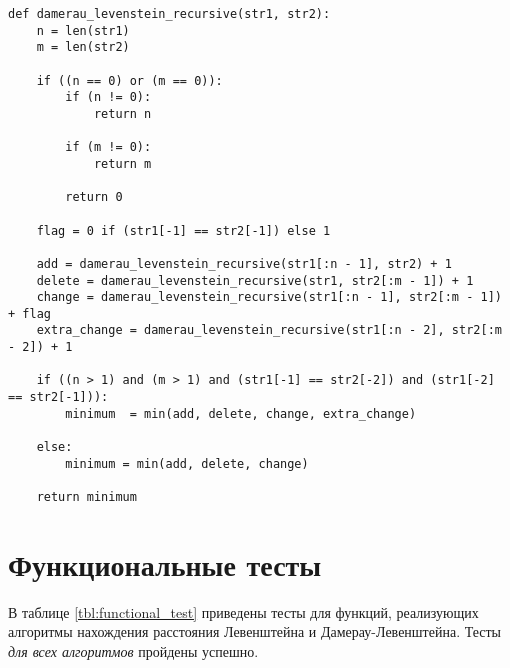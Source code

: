 \begin{center}
    \captionsetup{justification=raggedright,singlelinecheck=off}
    \begin{lstlisting}[label=lst:dam_lev_rec,caption=Алгоритм нахождения расстояния Дамерау-Левенштейна (реккурсивный)]
def damerau_levenstein_recursive(str1, str2):
    n = len(str1)
    m = len(str2)

    if ((n == 0) or (m == 0)):
        if (n != 0):
            return n
        
        if (m != 0):
            return m

        return 0

    flag = 0 if (str1[-1] == str2[-1]) else 1

    add = damerau_levenstein_recursive(str1[:n - 1], str2) + 1
    delete = damerau_levenstein_recursive(str1, str2[:m - 1]) + 1
    change = damerau_levenstein_recursive(str1[:n - 1], str2[:m - 1]) + flag
    extra_change = damerau_levenstein_recursive(str1[:n - 2], str2[:m - 2]) + 1

    if ((n > 1) and (m > 1) and (str1[-1] == str2[-2]) and (str1[-2] == str2[-1])):
        minimum  = min(add, delete, change, extra_change)

    else:
        minimum = min(add, delete, change)

    return minimum
\end{lstlisting}
\end{center}

\section{Функциональные тесты}

В таблице \ref{tbl:functional_test} приведены тесты для функций, реализующих алгоритмы нахождения расстояния Левенштейна и Дамерау-Левенштейна. Тесты \textit{для всех алгоритмов} пройдены успешно.

